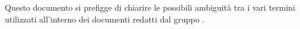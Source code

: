 Questo documento si prefigge di chiarire le possibili ambiguità tra i vari termini utilizzati all’interno dei documenti redatti dal gruppo \gruppo.